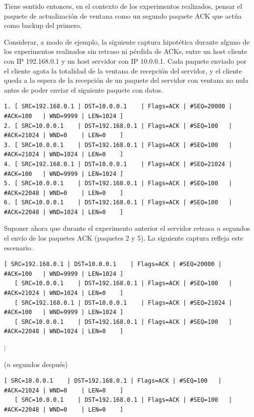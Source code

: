 \documentclass[a4paper, 10pt, twoside]{article}
\begin{document}
Tiene sentido entonces, en el contexto de los experimentos realizados, pensar el paquete de actualización de ventana como un segundo paquete ACK que actúa como backup del primero.

Considerar, a modo de ejemplo, la siguiente captura hipotética durante alguno de los experimentos realizados sin retraso ni pérdida de ACKs, entre un host cliente con IP 192.168.0.1 y un host servidor con IP 10.0.0.1. Cada paquete enviado por el cliente agota la totalidad de la ventana de recepción del servidor, y el cliente queda a la espera de la recepción de un paquete del servidor con ventana no nula antes de poder enviar el siguiente paquete con datos.

\begin{Verbatim}[fontsize=\small]
1. [ SRC=192.168.0.1 | DST=10.0.0.1    | Flags=ACK | #SEQ=20000 | #ACK=100   | WND=9999 | LEN=1024 ]
2. [ SRC=10.0.0.1    | DST=192.168.0.1 | Flags=ACK | #SEQ=100   | #ACK=21024 | WND=0    | LEN=0    ]
3. [ SRC=10.0.0.1    | DST=192.168.0.1 | Flags=ACK | #SEQ=100   | #ACK=21024 | WND=1024 | LEN=0    ]
4. [ SRC=192.168.0.1 | DST=10.0.0.1    | Flags=ACK | #SEQ=21024 | #ACK=100   | WND=9999 | LEN=1024 ]
5. [ SRC=10.0.0.1    | DST=192.168.0.1 | Flags=ACK | #SEQ=100   | #ACK=22048 | WND=0    | LEN=0    ]
6. [ SRC=10.0.0.1    | DST=192.168.0.1 | Flags=ACK | #SEQ=100   | #ACK=22048 | WND=1024 | LEN=0    ]
\end{Verbatim}

Suponer ahora que durante el experimento anterior el servidor retrasa $n$ segundos el envío de los paquetes ACK (paquetes 2 y 5). La siguiente captura refleja este escenario.

\begin{Verbatim}[fontsize=\small]
   [ SRC=192.168.0.1 | DST=10.0.0.1    | Flags=ACK | #SEQ=20000 | #ACK=100   | WND=9999 | LEN=1024 ]
   [ SRC=10.0.0.1    | DST=192.168.0.1 | Flags=ACK | #SEQ=100   | #ACK=21024 | WND=1024 | LEN=0    ]
   [ SRC=192.168.0.1 | DST=10.0.0.1    | Flags=ACK | #SEQ=21024 | #ACK=100   | WND=9999 | LEN=1024 ]
   [ SRC=10.0.0.1    | DST=192.168.0.1 | Flags=ACK | #SEQ=100   | #ACK=22048 | WND=1024 | LEN=0    ]
\end{Verbatim}

$\vdots$ 

($n$ segundos después)

\begin{Verbatim}[fontsize=\small]
   [ SRC=10.0.0.1    | DST=192.168.0.1 | Flags=ACK | #SEQ=100   | #ACK=21024 | WND=0    | LEN=0    ]
   [ SRC=10.0.0.1    | DST=192.168.0.1 | Flags=ACK | #SEQ=100   | #ACK=22048 | WND=0    | LEN=0    ]
\end{Verbatim}
\end{document}
